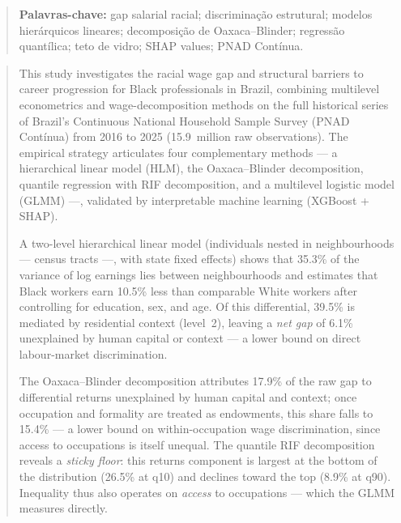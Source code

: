 \documentclass[12pt, a4paper, oneside]{article}
\begin{document}
\begin{abstract}
\bigskip
\noindent\textbf{Palavras-chave:} gap salarial racial; discriminação estrutural;
modelos hierárquicos lineares; decomposição de Oaxaca--Blinder; regressão quantílica;
teto de vidro; SHAP values; PNAD Contínua.
\end{abstract}

\newpage

\renewcommand{\abstractname}{Abstract}
\begin{abstract}
\noindent
This study investigates the racial wage gap and structural barriers to career
progression for Black professionals in Brazil, combining multilevel econometrics and
wage-decomposition methods on the full historical series of Brazil's Continuous
National Household Sample Survey (PNAD Contínua) from 2016 to 2025 (15.9~million raw
observations). The empirical strategy articulates four complementary methods --- a
hierarchical linear model (HLM), the Oaxaca--Blinder decomposition, quantile
regression with RIF decomposition, and a multilevel logistic model (GLMM) ---,
validated by interpretable machine learning (XGBoost + SHAP).

A two-level hierarchical linear model (individuals nested in neighbourhoods --- census
tracts ---, with state fixed effects) shows that 35.3\% of the variance of
log earnings lies between neighbourhoods and estimates that Black workers earn
10.5\% less than comparable White workers after controlling for education,
sex, and age. Of this differential, 39.5\% is
mediated by residential context (level~2), leaving a \textit{net gap} of 6.1\%
unexplained by human capital or context --- a lower bound on direct labour-market
discrimination.

The Oaxaca--Blinder decomposition attributes 17.9\% of the raw gap to
differential returns unexplained by human capital and context; once occupation and
formality are treated as endowments, this share falls to 15.4\% --- a lower
bound on within-occupation wage discrimination, since access to occupations is itself
unequal. The quantile RIF decomposition reveals a
\textit{sticky floor}: this returns component is largest at the bottom of the
distribution (26.5\% at q10) and declines toward the top (8.9\% at q90). Inequality
thus also operates on \emph{access} to occupations --- which the GLMM measures directly.


\end{abstract}
\end{document}
